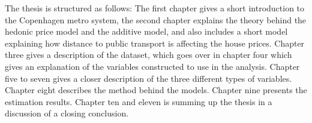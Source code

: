 The thesis is structured as follows: The first chapter gives a short
introduction to the Copenhagen metro system, the second chapter explains the 
theory behind the hedonic price model and the additive model, and also includes
a short model explaining how distance to public transport is affecting the 
house prices. Chapter three gives a description of the dataset, which goes over
in chapter four which gives an explanation of the variables constructed to use 
in the analysis. Chapter five to seven gives a closer description of the three 
different types of variables. Chapter eight describes the method behind the 
models. Chapter nine presents the estimation results. Chapter ten and eleven 
is summing up the thesis in a discussion of a closing conclusion. 
